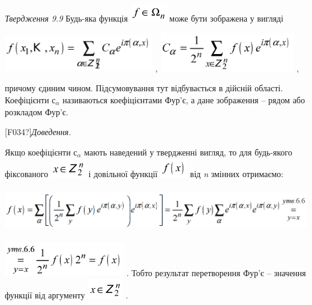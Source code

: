 \documentclass[a4paper]{article}
\newcounter{}
\begin{document}
\textit{Твердження 9.9  }Будь-яка функція 
\includegraphics[width=0.6252in,height=0.3016in]{crypt-img/crypt-img150.png} 
може бути зображена у вигляді

{\centering
 \includegraphics[width=2.5626in,height=0.6335in]{crypt-img/crypt-img151.png} , 
 \includegraphics[width=2.3154in,height=0.6689in]{crypt-img/crypt-img152.png} ,
\par}

причому єдиним чином. Підсумовування тут відбувається в дійсній області.
Коефіцієнти  ${\text{с}_{{\alpha }}}$ називаються коефіцієнтами Фур’є, а дане
зображення –\textcolor{red}{ }рядом  або розкладом Фур’є.

\textlatin{[F034?]}\textit{Доведення.} 

Якщо коефіцієнти  ${\text{с}_{{\alpha }}}$ мають наведений у твердженні вигляд,
то для будь-якого фіксованого 
\includegraphics[width=0.6055in,height=0.3382in]{crypt-img/crypt-img153.png}  
і довільної функції 
\includegraphics[width=0.4689in,height=0.3228in]{crypt-img/crypt-img154.png}
\textbf{ }від\textbf{ }\textit{n}\textit{ }змінних отримаємо:

{\centering 
\includegraphics[width=6.3654in,height=0.7362in]{crypt-img/crypt-img155.png}
\par}

 \includegraphics[width=2.0634in,height=0.5854in]{crypt-img/crypt-img156.png} . 
Тобто результат перетворення Фур’є – значення функції від аргументу 
\includegraphics[width=0.6102in,height=0.339in]{crypt-img/crypt-img157.png} .
\end{document}
